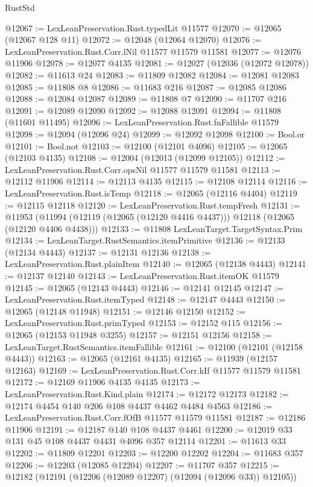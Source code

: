 \begin{lexlean}{RustStd}
\begin{coremodule}
@12067 := LexLeanPreservation.Rust.typedLit @11577
@12070 := @12065 (@12067 @128 @11)
@12072 := @12048 (@12064 @12070)
@12076 := LexLeanPreservation.Rust.Corr.lNil @11577 @11579 @11581
@12077 := @12076 @11906
@12078 := @12077 @4135
@12081 := @12027 (@12036 (@12072 @12078))
@12082 := @11613 @24
@12083 := @11809 @12082
@12084 := @12081 @12083
@12085 := @11808 @8
@12086 := @11683 @216
@12087 := @12085 @12086
@12088 := @12084 @12087
@12089 := @11808 @7
@12090 := @11707 @216
@12091 := @12089 @12090
@12092 := @12088 @12091
@12094 := @11808 (@11601 @11495)
@12096 := LexLeanPreservation.Rust.fnFallible @11579
@12098 := @12094 (@12096 @24)
@12099 := @12092 @12098
@12100 := Bool.or
@12101 := Bool.not
@12103 := @12100 (@12101 @4096)
@12105 := @12065 (@12103 @4135)
@12108 := @12004 (@12013 (@12099 @12105))
@12112 := LexLeanPreservation.Rust.Corr.opsNil @11577 @11579 @11581
@12113 := @12112 @11906
@12114 := @12113 @4135
@12115 := @12108 @12114
@12116 := LexLeanPreservation.Rust.isTemp
@12118 := @12065 (@12116 @4404)
@12119 := @12115 @12118
@12120 := LexLeanPreservation.Rust.tempFresh
@12131 := @11953
    (@11994 (@12119 (@12065 (@12120 @4416 @4437))) @12118 (@12065 (@12120 @4406 @4438)))
@12133 := @11808 LexLeanTarget.TargetSyntax.Prim
@12134 := LexLeanTarget.RustSemantics.itemPrimitive
@12136 := @12133 (@12134 @4443)
@12137 := @12131 @12136
@12138 := LexLeanPreservation.Rust.plainItem
@12140 := @12065 (@12138 @4443)
@12141 := @12137 @12140
@12143 := LexLeanPreservation.Rust.itemOK @11579
@12145 := @12065 (@12143 @4443)
@12146 := @12141 @12145
@12147 := LexLeanPreservation.Rust.itemTyped
@12148 := @12147 @4443
@12150 := @12065 (@12148 @11948)
@12151 := @12146 @12150
@12152 := LexLeanPreservation.Rust.primTyped
@12153 := @12152 @115
@12156 := @12065 (@12153 @11948 @3255)
@12157 := @12151 @12156
@12158 := LexLeanTarget.RustSemantics.itemFallible
@12161 := @12100 (@12101 (@12158 @4443))
@12163 := @12065 (@12161 @4135)
@12165 := @11939 (@12157 @12163)
@12169 := LexLeanPreservation.Rust.Corr.kIf @11577 @11579 @11581
@12172 := @12169 @11906 @4135 @4135
@12173 := LexLeanPreservation.Rust.Kind.plain
@12174 := @12172 @12173
@12182 := @12174 @4454 @140 @206 @108 @4437 @4462 @4484 @4563
@12186 := LexLeanPreservation.Rust.Corr.fOfB @11577 @11579 @11581
@12187 := @12186 @11906
@12191 := @12187 @140 @108 @4437 @4461
@12200 := @12019 @33 @131 @45 @108 @4437 @4431 @4096 @357 @12114
@12201 := @11613 @33
@12202 := @11809 @12201
@12203 := @12200 @12202
@12204 := @11683 @357
@12206 := @12203 (@12085 @12204)
@12207 := @11707 @357
@12215 := @12182 (@12191 (@12206 (@12089 @12207) (@12094 (@12096 @33)) @12105))

\end{coremodule}
\end{lexlean}
